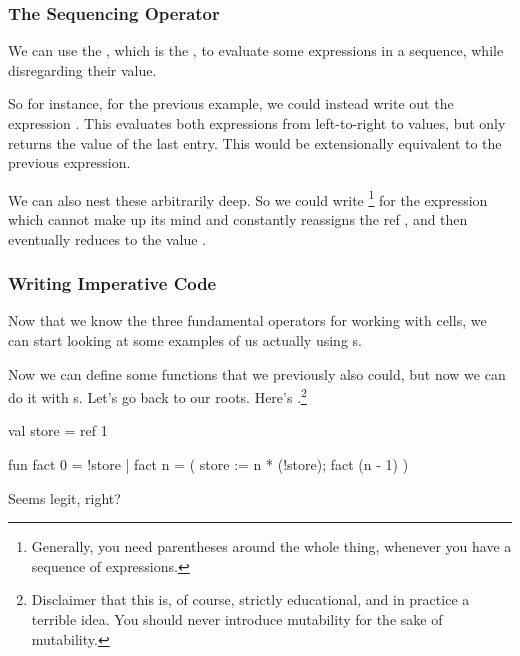 \documentclass[aspectratio=169, handout]{beamer}
\begin{document}
\begin{frame}[fragile]
  \frametitle{The Sequencing Operator}

  We can use the \code{;}, which is the , to
  evaluate some expressions in a sequence, while disregarding their value.

  \pause
  \vspace{\fill}

  So for instance, for the previous example, we could instead write out the
  expression . This evaluates both expressions from left-to-right
  to values, but only returns the value of the last entry. This would be extensionally
  equivalent to the previous expression.

  \pause
  \vspace{\fill}

  We can also nest these arbitrarily deep. So we could write \footnote{Generally, you need parentheses around the whole
  thing, whenever you have a sequence of expressions.} for the expression which
  cannot make up its mind and constantly reassigns the ref , and then
  eventually reduces to the value .
\end{frame}



\begin{frame}[fragile]
  \frametitle{Writing Imperative Code}

  Now that we know the three fundamental operators for working with 
  cells, we can start looking at some examples of us actually using s.

  \pause
  \vspace{\fill}

  Now we can define some functions that we previously also could,
  but now we can do it with s. Let's go back to our roots. Here's .\footnote{Disclaimer that this is, of course,
  strictly educational, and in practice a terrible idea. You should never introduce
  mutability for the sake of mutability.}

  \pause
  \vspace{\fill}

  \begin{codeblock}
    val store = ref 1

    fun fact 0 = !store
      | fact n =
          ( store := n * (!store);
            fact (n - 1)
          )
  \end{codeblock}

  \pause
  \vspace{\fill}

  Seems legit, right?
\end{frame}
\end{document}
